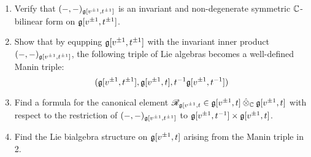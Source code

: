             \begin{question}
                \begin{enumerate}
                    \item Verify that $(-, -)_{\mathfrak{g}[v^{\pm 1}, t^{\pm 1}]}$ is an invariant and non-degenerate symmetric $\mathbb{C}$-bilinear form on $\mathfrak{g}[v^{\pm 1}, t^{\pm 1}]$.
                    \item Show that by equpping $\mathfrak{g}[v^{\pm 1}, t^{\pm 1}]$ with the invariant inner product $(-, -)_{\mathfrak{g}[v^{\pm 1}, t^{\pm 1}]}$, the following triple of Lie algebras becomes a well-defined Manin triple:
                        $$(\mathfrak{g}[v^{\pm 1}, t^{\pm 1}], \mathfrak{g}[v^{\pm 1}, t], t^{-1}\mathfrak{g}[v^{\pm 1}, t^{-1}])$$
                    \item Find a formula for the canonical element $\scrR_{\g[v^{\pm 1}, t} \in \g[v^{\pm 1}, t] \hattensor_{\bbC} \g[v^{\pm 1}, t]$ with respect to the restriction of $(-, -)_{\mathfrak{g}[v^{\pm 1}, t^{\pm 1}]}$ to $\g[v^{\pm 1}, t^{-1}] \x \g[v^{\pm 1}, t]$.
                    \item Find the Lie bialgebra structure on $\mathfrak{g}[v^{\pm 1}, t]$ arising from the Manin triple in 2.
                \end{enumerate}
            \end{question}
